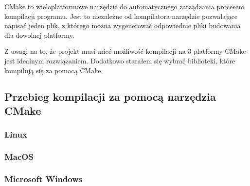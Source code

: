 \par
CMake to wieloplatformowe narzędzie do automatycznego zarządzania procesem kompilacji programu.
Jest to niezależne od kompilatora narzędzie pozwalające napisać jeden plik, z którego można wygenerować odpowiednie pliki budowania dla dowolnej platformy.
\par
Z uwagi na to, że projekt musi mieć możliwość kompilacji na 3 platformy CMake jest idealnym rozwiązaniem.
Dodatkowo starałem się wybrać biblioteki, które kompilują się za pomocą CMake.

\subsection{Przebieg kompilacji za pomocą narzędzia CMake}

\subsubsection{Linux}

\subsubsection{MacOS}

\subsubsection{Microsoft Windows}
